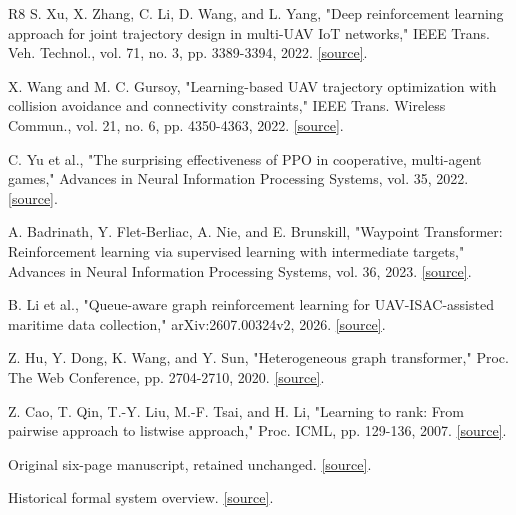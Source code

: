 \begin{thebibliography}{R8}
 S. Xu, X. Zhang, C. Li, D. Wang, and L. Yang, "Deep reinforcement learning approach for joint trajectory design in multi-UAV IoT networks," IEEE Trans. Veh. Technol., vol. 71, no. 3, pp. 3389-3394, 2022. \href{https://ieeexplore.ieee.org/document/9689948/}{[source]}.

 X. Wang and M. C. Gursoy, "Learning-based UAV trajectory optimization with collision avoidance and connectivity constraints," IEEE Trans. Wireless Commun., vol. 21, no. 6, pp. 4350-4363, 2022. \href{https://arxiv.org/abs/2104.06256}{[source]}.

 C. Yu et al., "The surprising effectiveness of PPO in cooperative, multi-agent games," Advances in Neural Information Processing Systems, vol. 35, 2022. \href{https://proceedings.neurips.cc/paper_files/paper/2022/hash/9c1535a02f0ce079433344e14d910597-Abstract.html}{[source]}.

 A. Badrinath, Y. Flet-Berliac, A. Nie, and E. Brunskill, "Waypoint Transformer: Reinforcement learning via supervised learning with intermediate targets," Advances in Neural Information Processing Systems, vol. 36, 2023. \href{https://papers.nips.cc/paper_files/paper/2023/hash/f58c24798220ba724fe05c0fa786227d-Abstract-Conference.html}{[source]}.

 B. Li et al., "Queue-aware graph reinforcement learning for UAV-ISAC-assisted maritime data collection," arXiv:2607.00324v2, 2026. \href{https://arxiv.org/abs/2607.00324v2}{[source]}.

 Z. Hu, Y. Dong, K. Wang, and Y. Sun, "Heterogeneous graph transformer," Proc. The Web Conference, pp. 2704-2710, 2020. \href{https://arxiv.org/abs/2003.01332}{[source]}.

 Z. Cao, T. Qin, T.-Y. Liu, M.-F. Tsai, and H. Li, "Learning to rank: From pairwise approach to listwise approach," Proc. ICML, pp. 129-136, 2007. \href{https://www.cs.nccu.edu.tw/~mftsai/papers/icml2007_tsai.pdf}{[source]}.

 Original six-page manuscript, retained unchanged. \href{https://github.com/ISAAC558345/waypoint-transformer/blob/26e35e9abcf2d79a7e5d3b932387af8d32d88431/docs/paper/Execution_Grounded_Hierarchical_Graph_Learning_MultiUAV.pdf}{[source]}.

 Historical formal system overview. \href{https://github.com/ISAAC558345/waypoint-transformer/blob/26e35e9abcf2d79a7e5d3b932387af8d32d88431/docs/SYSTEM_OVERVIEW_CN.md}{[source]}.


\end{thebibliography}
